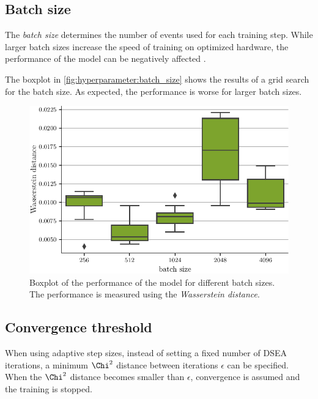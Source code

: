 \subsection{Batch size}
The \emph{batch size} determines the number of events used for each training step.
While larger batch sizes increase the speed of training
on optimized hardware,
the performance of the model can be negatively affected \cite{batchsize_kandel}.

The boxplot in \autoref{fig:hyperparameter:batch_size} shows the results of a grid search for the batch size.
As expected, the performance is worse for larger batch sizes.

\begin{figure}
  \centering
  \includegraphics[scale=1]{content/plots/hyperparam/batch_size_vs_wd_boxplot_full.pdf}
  \caption{Boxplot of the performance of the model for different batch sizes.
    The performance is measured using the \emph{Wasserstein distance}.
  }
  \label{fig:hyperparameter:batch_size}
\end{figure}


\subsection{Convergence threshold}
When using adaptive step sizes,
instead of setting a fixed number of DSEA iterations,
a minimum $\Chi^2$ distance between iterations $\epsilon$
can be specified.
When the $\Chi^2$ distance becomes smaller than $\epsilon$,
convergence is assumed and the training is stopped.

